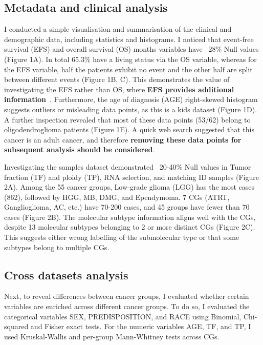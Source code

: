 \documentclass[a4paper,11pt]{article}
\begin{document}
\subsection{Metadata and clinical analysis}
I conducted a simple visualisation and summarisation of the clinical and demographic data, including statistics and 
histograms. I noticed that event-free survival (EFS) and overall survival (OS) months variables have ~28\% Null values (Figure 1A). 
In total 65.3\% have a living status via the OS variable, whereas for the EFS variable, half the patients exhibit no event 
and the other half are split between different events (Figure 1B, C). This demonstrates the value of investigating the 
EFS rather than OS, where \textbf{EFS provides additional information}~\citep{41186880.nbib}. Furthermore, the age of diagnosis (AGE) right-skewed histogram suggests outliers or misleading data points, as this is a kids dataset (Figure 1D). A further inspection revealed
that most of these data points (53/62) belong to oligodendroglioma patients (Figure 1E). A quick web search suggested
that this cancer is an adult cancer, and therefore \textbf{removing these data points for subsequent analysis should be considered}.

Investigating the samples dataset demonstrated ~20-40\% Null values in Tumor fraction (TF) and ploidy (TP), RNA selection, and 
matching ID samples (Figure 2A). Among the 55 cancer groups, Low-grade glioma (LGG) has the most cases (862), followed by HGG, MB, DMG, and Ependymoma.
7 CGs (ATRT, Ganglioglioma, AC, etc.) have 70-200 cases, and 45 groups have fewer than 70 cases (Figure 2B). The molecular subtype information aligns well
with the CGs, despite 13 molecular subtypes belonging to 2 or more distinct CGs (Figure 2C). This suggests either wrong labelling of the submolecular type or that some subtypes belong 
to multiple CGs.

\subsection{Cross datasets analysis}
Next, to reveal differences between cancer groups, I evaluated whether certain variables are enriched across different cancer groups.
To do so, I evaluated the categorical variables SEX, PREDISPOSITION, and RACE using Binomial, Chi-squared and Fisher exact
tests. For the numeric variables AGE, TF, and TP, I used Kruskal-Wallis and per-group Mann-Whitney tests across CGs. 
\end{document}
